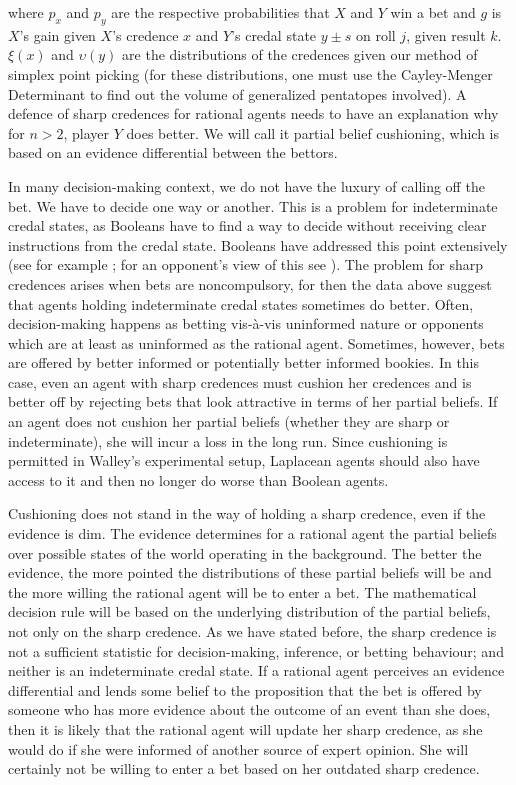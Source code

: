 where $p_{x}$ and $p_{y}$ are the respective
probabilities that $X$ and $Y$ win a bet and $g$ is
$X$'s gain given $X$'s credence $x$ and $Y$'s credal
state $y\pm{}s$ on roll $j$, given result $k$. $\xi(x)$
and $\upsilon(y)$ are the distributions of the
credences given our method of simplex point picking
(for these distributions, one must use the
Cayley-Menger Determinant to find out the volume of
generalized pentatopes involved). A defence of sharp
credences for rational agents needs to have an
explanation why for $n>2$, player $Y$ does better. We
will call it partial belief cushioning, which is based
on an evidence differential between the bettors.

In many decision-making context, we do not have the
luxury of calling off the bet. We have to decide one
way or another. This is a problem for indeterminate
credal states, as Booleans have to find a way to decide
without receiving clear instructions from the credal
state. Booleans have addressed this point extensively
(see for example ; for an
opponent's view of this see ).
The problem for sharp credences arises when bets are
noncompulsory, for then the data above suggest that
agents holding indeterminate credal states sometimes do
better. Often, decision-making happens as betting
vis-{\`a}-vis uninformed nature or opponents which are
at least as uninformed as the rational agent.
Sometimes, however, bets are offered by better informed
or potentially better informed bookies. In this case,
even an agent with sharp credences must cushion her
credences and is better off by rejecting bets that look
attractive in terms of her partial beliefs. If an agent
does not cushion her partial beliefs (whether they are
sharp or indeterminate), she will incur a loss in the
long run. Since cushioning is permitted in Walley's
experimental setup, Laplacean agents should also have
access to it and then no longer do worse than Boolean
agents.

Cushioning does not stand in the way of holding a sharp
credence, even if the evidence is dim. The evidence
determines for a rational agent the partial beliefs
over possible states of the world operating in the
background. The better the evidence, the more pointed
the distributions of these partial beliefs will be and
the more willing the rational agent will be to enter a
bet. The mathematical decision rule will be based on
the underlying distribution of the partial beliefs, not
only on the sharp credence. As we have stated before,
the sharp credence is not a sufficient statistic for
decision-making, inference, or betting behaviour; and
neither is an indeterminate credal state. If a rational
agent perceives an evidence differential and lends some
belief to the proposition that the bet is offered by
someone who has more evidence about the outcome of an
event than she does, then it is likely that the
rational agent will update her sharp credence, as she
would do if she were informed of another source of
expert opinion. She will certainly not be willing to
enter a bet based on her outdated sharp credence.

